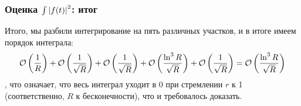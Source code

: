 \subsubsection{Оценка $\int \abs{f(t)}^2$: итог}
Итого, мы разбили интегрирование на пять различных участков, и в итоге имеем порядок интеграла:
\[
\mathcal{O} \left( \frac{1}{R} \right) + \mathcal{O} \left( \frac{1}{\sqrt{R}} \right) + \mathcal{O} \left( \frac{1}{\sqrt{R}} \right) + \mathcal{O}\left( \frac{\ln^3 R}{\sqrt{R}} \right) + \mathcal{O} \left( \frac{1}{\sqrt{R}} \right) = \mathcal{O}\left( \frac{\ln^3 R}{\sqrt{R}} \right)
\]
, что означает, что весь интеграл уходит в 0 при стремлении $r$ к 1 (соответственно, $R$ к бесконечности), что и требовалось доказать.
